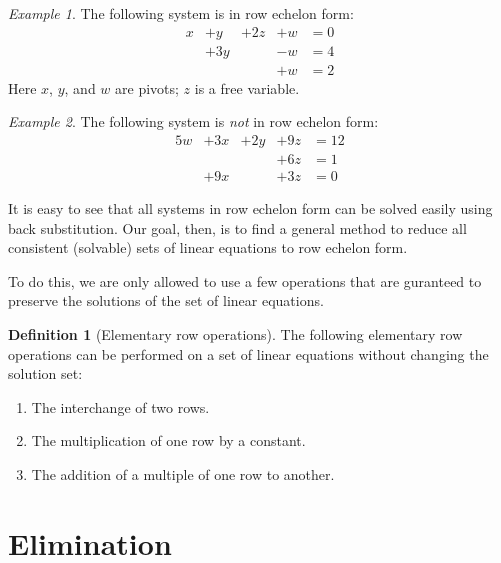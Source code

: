 \documentclass[10pt, a4paper]{amsart}
\theoremstyle{definition}
\newtheorem{defn}{Definition}
\theoremstyle{remark}
\newtheorem{ex}{Example}
\begin{document}
\begin{ex}
  The following system is in row echelon form:
  \begin{displaymath}\begin{array}{rllll}
    x &+ y &+ 2z &+ w &= 0\\
      &+3y &     &- w &= 4\\
      &    &     &+ w &= 2
  \end{array}\end{displaymath}
  Here $ x $, $ y $, and $ w $ are pivots; $ z $ is a free variable.
\end{ex}

\begin{ex}
  The following system is \emph{not} in row echelon form:
  \begin{displaymath}\begin{array}{rllll}
    5w & +3x & +2y & + 9z &= 12\\
       &     &     & + 6z &= 1\\
       & +9x &     & + 3z &= 0
  \end{array}\end{displaymath}
\end{ex}

It is easy to see that all systems in row echelon form can
be solved easily using back substitution. Our goal, then,
is to find a general method to reduce all consistent (solvable)
sets of linear equations to row echelon form.

To do this, we are only allowed to use a few operations that
are guranteed to preserve the solutions of the set of linear
equations.

\begin{defn}[Elementary row operations]
  The following elementary row operations can be performed
  on a set of linear equations without changing the solution
  set:
  \begin{enumerate}
    \item The interchange of two rows.
    \item The multiplication of one row by a constant.
    \item The addition of a multiple of one row to another.
  \end{enumerate}
\end{defn}

\section{Elimination}
\end{document}
